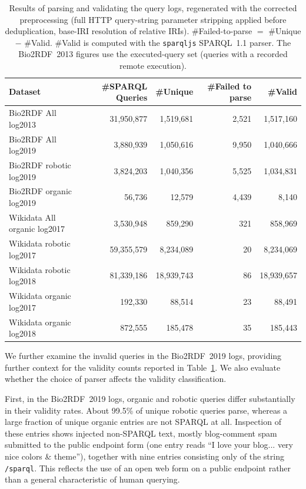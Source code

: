 \documentclass[sw]{iosart2x}
\begin{document}

\begin{table}[ht]
\centering
\caption{Results of parsing and validating the query logs, regenerated with the
corrected preprocessing (full HTTP query-string parameter stripping applied before
deduplication, base-IRI resolution of relative IRIs). \#Failed-to-parse $=$ \#Unique
$-$ \#Valid. \#Valid is computed with the \texttt{sparqljs} SPARQL~1.1 parser.
The Bio2RDF~2013 figures use the executed-query set (queries with a recorded remote
execution).}
\label{tab:2}
\begin{tabular}{l|r|r|r|r}
\hline
Dataset & \#SPARQL Queries & \#Unique & \#Failed to parse & \#Valid \\
\hline
Bio2RDF All log2013 & 31,950,877 & 1,519,681 & 2,521 & 1,517,160 \\
Bio2RDF All log2019 & 3,880,939 & 1,050,616 & 9,950 & 1,040,666 \\
Bio2RDF robotic log2019 & 3,824,203 & 1,040,356 & 5,525 & 1,034,831 \\
Bio2RDF organic log2019 & 56,736 & 12,579 & 4,439 & 8,140 \\
Wikidata All organic log2017 & 3,530,948 & 859,290 & 321 & 858,969 \\
Wikidata robotic log2017 & 59,355,579 & 8,234,089 & 20 & 8,234,069 \\
Wikidata robotic log2018 & 81,339,186 & 18,939,743 & 86 & 18,939,657 \\
Wikidata organic log2017 & 192,330 & 88,514 & 23 & 88,491 \\
Wikidata organic log2018 & 872,555 & 185,478 & 35 & 185,443 \\
\hline
\end{tabular}
\end{table}


We further examine the invalid queries in the Bio2RDF~2019 logs, providing further context for the validity counts reported in Table~\ref{tab:2}. We also evaluate whether the choice of parser affects the validity classification.

First, in the Bio2RDF~2019 logs, organic and robotic queries differ substantially in their validity rates. About 99.5\% of unique robotic queries parse, whereas a large fraction of unique organic entries are not SPARQL at all. Inspection of these entries shows injected non-SPARQL text, mostly blog-comment spam submitted to the public endpoint form (one entry reads ``I love your blog... very nice colors \& theme''), together with nine entries consisting only of the string \texttt{/sparql}. This reflects the use of an open web form on a public endpoint rather than a general characteristic of human querying. 
\end{document}
